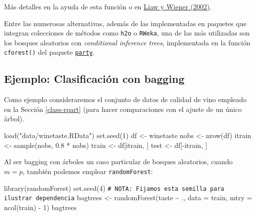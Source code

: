 \documentclass[
]{book}
\newenvironment{Shaded}{\begin{snugshade}}{\end{snugshade}}
\newcommand{\AttributeTok}[1]{\textcolor[rgb]{0.77,0.63,0.00}{#1}}
\newcommand{\CommentTok}[1]{\textcolor[rgb]{0.56,0.35,0.01}{\textit{#1}}}
\newcommand{\DecValTok}[1]{\textcolor[rgb]{0.00,0.00,0.81}{#1}}
\newcommand{\FloatTok}[1]{\textcolor[rgb]{0.00,0.00,0.81}{#1}}
\newcommand{\FunctionTok}[1]{\textcolor[rgb]{0.00,0.00,0.00}{#1}}
\newcommand{\NormalTok}[1]{#1}
\newcommand{\OtherTok}[1]{\textcolor[rgb]{0.56,0.35,0.01}{#1}}
\newcommand{\SpecialCharTok}[1]{\textcolor[rgb]{0.00,0.00,0.00}{#1}}
\newcommand{\StringTok}[1]{\textcolor[rgb]{0.31,0.60,0.02}{#1}}
\theoremstyle{break}
\theoremstyle{nonumberplain}
\renewcommand{\CommentTok}[1]{\textcolor[rgb]{0.41,0.41,0.41}{\texttt{#1}}}
\begin{document}
Más detalles en la ayuda de esta función o en \href{https://www.r-project.org/doc/Rnews/Rnews_2002-3.pdf}{Liaw y Wiener (2002)}.

Entre las numerosas alternativas, además de las implementadas en paquetes que integran colecciones de métodos como \texttt{h2o} o \texttt{RWeka}, una de las más utilizadas son los bosques aleatorios con \emph{conditional inference trees}, implementada en la función \texttt{cforest()} del paquete \href{https://CRAN.R-project.org/package=party}{\texttt{party}}.

\hypertarget{ejemplo-clasificaciuxf3n-con-bagging}{%
\subsection{Ejemplo: Clasificación con bagging}\label{ejemplo-clasificaciuxf3n-con-bagging}}

Como ejemplo consideraremos el conjunto de datos de calidad de vino empleado en la Sección \ref{class-rpart} (para hacer comparaciones con el ajuste de un único árbol).

\begin{Shaded}
\begin{Highlighting}[]
\FunctionTok{load}\NormalTok{(}\StringTok{"data/winetaste.RData"}\NormalTok{)}
\FunctionTok{set.seed}\NormalTok{(}\DecValTok{1}\NormalTok{)}
\NormalTok{df }\OtherTok{\textless{}{-}}\NormalTok{ winetaste}
\NormalTok{nobs }\OtherTok{\textless{}{-}} \FunctionTok{nrow}\NormalTok{(df)}
\NormalTok{itrain }\OtherTok{\textless{}{-}} \FunctionTok{sample}\NormalTok{(nobs, }\FloatTok{0.8} \SpecialCharTok{*}\NormalTok{ nobs)}
\NormalTok{train }\OtherTok{\textless{}{-}}\NormalTok{ df[itrain, ]}
\NormalTok{test }\OtherTok{\textless{}{-}}\NormalTok{ df[}\SpecialCharTok{{-}}\NormalTok{itrain, ]}
\end{Highlighting}
\end{Shaded}

Al ser bagging con árboles un caso particular de bosques aleatorios, cuando \(m = p\), también podemos emplear \texttt{randomForest}:

\begin{Shaded}
\begin{Highlighting}[]
\FunctionTok{library}\NormalTok{(randomForest)}
\FunctionTok{set.seed}\NormalTok{(}\DecValTok{4}\NormalTok{) }\CommentTok{\# NOTA: Fijamos esta semilla para ilustrar dependencia}
\NormalTok{bagtrees }\OtherTok{\textless{}{-}} \FunctionTok{randomForest}\NormalTok{(taste }\SpecialCharTok{\textasciitilde{}}\NormalTok{ ., }\AttributeTok{data =}\NormalTok{ train, }\AttributeTok{mtry =} \FunctionTok{ncol}\NormalTok{(train) }\SpecialCharTok{{-}} \DecValTok{1}\NormalTok{)}
\NormalTok{bagtrees}
\end{Highlighting}
\end{Shaded}
\end{document}
